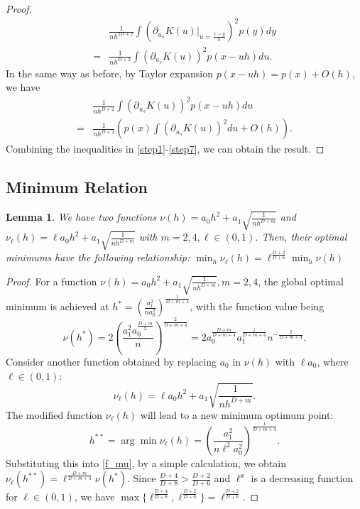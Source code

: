 \documentclass[aos,preprint]{imsart}
\newtheorem{lemma}[theorem]{Lemma}
\theoremstyle{remark}
\begin{document}
\begin{appendix}
\begin{proof}
\begin{equation}\label{step5}
\begin{aligned}
&\frac{1}{n h^{2D+2}} \int (\partial_{u_s } K (u) |_{u=\frac{x - y}{h}})^2 p(y) dy \\
= &\frac{1}{n h^{D+2}} \int (\partial_{u_s } K (u) )^2 p(x-uh) du.
\end{aligned}
\end{equation}\label{step6}
In the same way as before, by Taylor expansion $p(x-uh)=p(x)+O(h)$, we have
\begin{equation}\label{step7}
\begin{aligned}
&\frac{1}{n h^{D+2}} \int (\partial_{u_s } K (u) )^2 p(x-uh) du\\
 = &\frac{1}{n h^{D+2}}  (p(x) \int (\partial_{u_s } K (u) )^2   du + O(h)).
\end{aligned}
\end{equation}
Combining the inequalities in \eqref{step1}-\eqref{step7}, we can obtain the result.
\end{proof}

\subsection{Minimum Relation}
\begin{lemma}\label{improve_lemma}
We have two functions $\nu(h) = a_0 h^2 + a_1 \sqrt{\frac{1}{nh^{D+m}}}$ and $\nu_\ell (h) = \ell a_0 h^2 + a_1 \sqrt{\frac{1}{nh^{D+m}}}$ with $m=2,4,\ell \in(0,1)$. Then, their optimal minimums have the following relationship: $\min_h \nu_\ell (h) = \ell^{\frac{D+2}{D+6}}\min_h \nu(h)$
\end{lemma} 

\begin{proof}\label{mimimum_proof}
For a function $\nu(h) = a_0 h^2 + a_1 \sqrt{\frac{1}{nh^{D+m}}}, m=2,4$, the global optimal minimum is achieved at $h^* = 
(\frac{a_1^2}{n a_0^2})^{\frac{1}{D+m+4}}$, with the function value being
\[
\nu(h^*) = 2(\frac{a_1^2 a_0^{\frac{D+m}{2}}}{n})^{\frac{2}{D+m+4}}=2 a_0^{\frac{D+m}{D+m+4}} a_1^{\frac{1}{D+m+4}} {n}^{-\frac{2}{D+m+4}}.
\]
Consider another function obtained by replacing $a_0$ in $\nu(h)$ with $\ell a_0$, where $\ell \in(0,1)$:
\begin{equation}\label{f_mu}
\nu_\ell (h) = \ell a_0 h^2 + a_1 \sqrt{\frac{1}{nh^{D+m}}}.
\end{equation}
The modified function $\nu_\ell(h)$ will lead to a new minimum optimum point:
\[
h^{**} =\arg\min \nu_\ell( h)=(\frac{a_1^2}{n \ell^2 a_0^2})^{\frac{1}{D+m+4}}.
\] 
Substituting this into \eqref{f_mu}, by a simple calculation, we obtain $\nu_\ell (h^{**}) = \ell^{\frac{D+m}{D+m+4}}\nu(h^*)$.
Since $\frac{D+4}{D+8}>\frac{D+2}{D+6}$ and $\ell^x$ is a decreasing function for $\ell \in (0,1)$, we have $\max\{\ell^{\frac{D+4}{D+8}}, \ell^{\frac{D+2}{D+6}}\} = \ell^{\frac{D+2}{D+6}}$. 
\end{proof}

\end{appendix}
\end{document}
